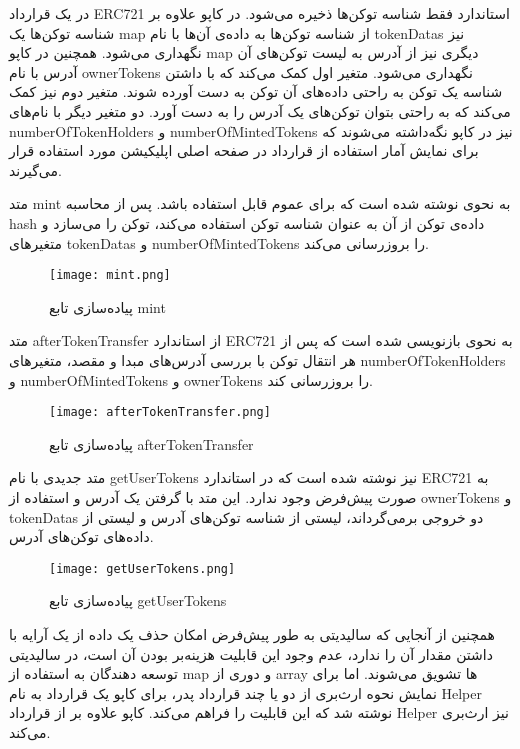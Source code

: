 در یک قرارداد ERC721 استاندارد فقط شناسه توکن‌ها ذخیره می‌شود. در کاپو علاوه بر شناسه توکن‌ها یک map از شناسه توکن‌ها به داده‌ی آن‌ها با نام tokenDatas نیز نگهداری می‌شود. همچنین در کاپو map دیگری نیز از آدرس به لیست توکن‌های آن آدرس با نام ownerTokens نگهداری می‌شود. متغیر اول کمک می‌کند که با داشتن شناسه یک توکن به راحتی داده‌های آن توکن به دست آورده شوند. متغیر دوم نیز کمک می‌کند که به راحتی بتوان توکن‌های یک آدرس را به دست آورد. دو متغیر دیگر با نام‌های numberOfTokenHolders و numberOfMintedTokens نیز در کاپو نگه‌داشته می‌شوند که برای نمایش آمار استفاده از قرارداد در صفحه اصلی اپلیکیشن مورد استفاده قرار می‌گیرند.

متد mint به نحوی نوشته شده است که برای عموم قابل استفاده باشد. پس از محاسبه hash داده‌ی توکن از آن به عنوان شناسه توکن استفاده می‌کند، توکن را می‌سازد و متغیرهای tokenDatas و numberOfMintedTokens را بروزرسانی می‌کند.

\begin{figure}[ht]
\centerline{\texttt{[image: mint.png]}}
\caption{پیاده‌سازی تابع mint}
\label{fig:mint}
\end{figure}

متد afterTokenTransfer از استاندارد ERC721 به نحوی بازنویسی
شده است که پس از هر انتقال توکن با بررسی آدرس‌های مبدا و مقصد، متغیر‌های numberOfTokenHolders و numberOfMintedTokens و ownerTokens را بروزرسانی کند.

\begin{figure}[ht]
\centerline{\texttt{[image: afterTokenTransfer.png]}}
\caption{پیاده‌سازی تابع afterTokenTransfer}
\label{fig:afterTokenTransfer}
\end{figure}

متد جدیدی با نام getUserTokens نیز نوشته شده است که در استاندارد ERC721 به صورت پیش‌فرض وجود ندارد. این متد با گرفتن یک آدرس و استفاده از ownerTokens و tokenDatas دو خروجی برمی‌گرداند، لیستی از شناسه توکن‌های آدرس و لیستی از داده‌های توکن‌های آدرس.

\begin{figure}[ht]
\centerline{\texttt{[image: getUserTokens.png]}}
\caption{پیاده‌سازی تابع getUserTokens}
\label{fig:getUserTokens}
\end{figure}

همچنین از آنجایی که سالیدیتی به طور پیش‌فرض امکان حذف یک داده از یک آرایه با داشتن مقدار آن را ندارد، عدم وجود این قابلیت هزینه‌بر بودن آن است، در سالیدیتی توسعه دهندگان به استفاده از map و دوری از array ها تشویق می‌شوند. اما برای نمایش نحوه ارث‌بری از دو یا چند قرارداد پدر، برای کاپو یک قرارداد به نام Helper نوشته شد که این قابلیت را فراهم می‌کند. کاپو علاوه بر
از قرارداد Helper نیز ارث‌بری می‌کند.

